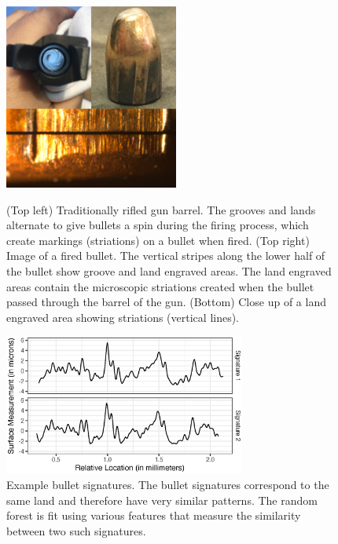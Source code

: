 \documentclass[AMS,STIX2COL]{WileyNJD-v2}\usepackage[]{graphicx}\usepackage[]{color}
\newenvironment{knitrout}{}{} %
\begin{document}
\begin{figure}[!t]
\centering
\begin{knitrout}
\color{fgcolor}

{\centering \includegraphics[width=2.25in]{figure-08-1} 

}



\end{knitrout}
\caption{(Top left) Traditionally rifled gun barrel. The grooves and lands alternate to give bullets a spin during the firing process, which create markings (striations) on a bullet when fired. (Top right) Image of a fired bullet. The vertical stripes along the lower half of the bullet show groove and land engraved areas. The land engraved areas contain the microscopic striations created when the bullet passed through the barrel of the gun. (Bottom) Close up of a land engraved area showing striations (vertical lines).}
\label{fig:figure-08}

\vspace*{\floatsep}

\begin{knitrout}
\color{fgcolor}

{\centering \includegraphics[width=3.125in]{figure-09-1} 

}



\end{knitrout}
\caption{Example bullet signatures. The bullet signatures correspond to the same land and therefore have very similar patterns. The \citet{hare:2016} random forest is fit using various features that measure the similarity between two such signatures.}
\label{fig:figure-09}
\end{figure}
\end{document}
